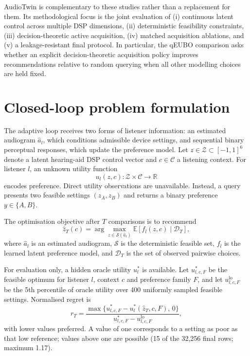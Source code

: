\documentclass[preprint,12pt]{elsarticle}
\begin{document}
AudioTwin is complementary to these studies rather than a replacement for them. Its methodological focus is the joint evaluation of (i) continuous latent control across multiple DSP dimensions, (ii) deterministic feasibility constraints, (iii) decision-theoretic active acquisition, (iv) matched acquisition ablations, and (v) a leakage-resistant final protocol. In particular, the qEUBO comparison asks whether an explicit decision-theoretic acquisition policy improves recommendations relative to random querying when all other modelling choices are held fixed.

\section{Closed-loop problem formulation}
\label{sec:problem}

The adaptive loop receives two forms of listener information: an estimated audiogram $\hat a_l$, which conditions admissible device settings, and sequential binary perceptual responses, which update the preference model. Let $z\in\mathcal Z\subset[-1,1]^6$ denote a latent hearing-aid DSP control vector and $c\in\mathcal C$ a listening context. For listener $l$, an unknown utility function
\begin{equation}
    u_l(z,c):\mathcal Z\times\mathcal C\rightarrow\mathbb R
\end{equation}
encodes preference. Direct utility observations are unavailable. Instead, a query presents two feasible settings $(z_A,z_B)$ and returns a binary preference $y\in\{A,B\}$.

The optimisation objective after $T$ comparisons is to recommend
\begin{equation}
    \hat z_T(c)=\arg\max_{z\in\mathcal S(\hat a_l)} \mathbb E[f_l(z,c)\mid\mathcal D_T],
    \label{eq:recommend}
\end{equation}
where $\hat a_l$ is an estimated audiogram, $\mathcal S$ is the deterministic feasible set, $f_l$ is the learned latent preference model, and $\mathcal D_T$ is the set of observed pairwise choices.

For evaluation only, a hidden oracle utility $u_l^*$ is available. Let $u^*_{l,c,F}$ be the feasible optimum for listener $l$, context $c$ and preference family $F$, and let $u^{\mathrm{lo}}_{l,c,F}$ be the 5th percentile of oracle utility over 400 uniformly sampled feasible settings. Normalised regret is
\begin{equation}
    r_T = \frac{\max\{u^*_{l,c,F}-u_l^*(\hat z_T,c,F),\,0\}}{u^*_{l,c,F}-u^{\mathrm{lo}}_{l,c,F}},
    \label{eq:regret}
\end{equation}
with lower values preferred. A value of one corresponds to a setting as poor as that low reference; values above one are possible (15 of the 32,256 final rows; maximum 1.17).
\end{document}
